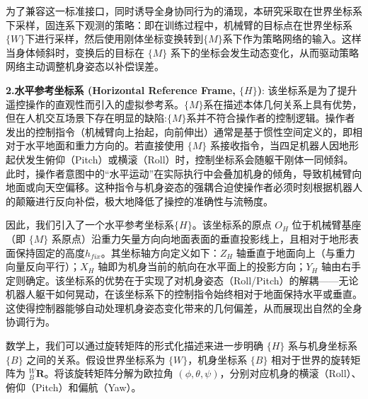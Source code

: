为了兼容这一标准接口，同时诱导全身协同行为的涌现，本研究采取在世界坐标系下采样，固连系下观测的策略：即在训练过程中，机械臂的目标点在世界坐标系$\{W\}$下进行采样，然后使用刚体坐标变换转到$\{M\}$系下作为策略网络的输入。这样当身体倾斜时，变换后的目标在 $\{M\}$ 系下的坐标会发生动态变化，从而驱动策略网络主动调整机身姿态以补偿误差。

\textbf{2.水平参考坐标系 (Horizontal Reference Frame, $\{H\}$)}: 该坐标系是为了提升遥控操作的直观性而引入的虚拟参考系。$\{M\}$系在描述本体几何关系上具有优势，但在人机交互场景下存在明显的缺陷:$\{M\}$系并不符合操作者的控制逻辑。操作者发出的控制指令（机械臂向上抬起，向前伸出）通常是基于惯性空间定义的，即相对于水平地面和重力方向的。若直接使用 $\{M\}$ 系接收指令，当四足机器人因地形起伏发生俯仰（Pitch）或横滚（Roll）时，控制坐标系会随躯干刚体一同倾斜。此时，操作者意图中的“水平运动”在实际执行中会叠加机身的倾角，导致机械臂向地面或向天空偏移。这种指令与机身姿态的强耦合迫使操作者必须时刻根据机器人的颠簸进行反向补偿，极大地降低了操控的准确性与流畅度。

因此，我们引入了一个水平参考坐标系$\{H\}$\cite{fu2023deep}。该坐标系的原点 $O_H$ 位于机械臂基座（即 $\{M\}$ 系原点）沿重力矢量方向向地面表面的垂直投影线上，且相对于地形表面保持固定的高度$h_{fix}$。其坐标轴方向定义如下：$Z_H$ 轴垂直于地面向上（与重力向量反向平行）；$X_H$ 轴即为机身当前的航向在水平面上的投影方向；$Y_H$ 轴由右手定则确定。该坐标系的优势在于实现了对机身姿态（Roll/Pitch）的解耦——无论机器人躯干如何晃动，在该坐标系下的控制指令始终相对于地面保持水平或垂直。这使得控制器能够自动处理机身姿态变化带来的几何偏差，从而展现出自然的全身协调行为。

数学上，我们可以通过旋转矩阵的形式化描述来进一步明确 $\{H\}$ 系与机身坐标系 $\{B\}$ 之间的关系。假设世界坐标系为 $\{W\}$，机身坐标系 $\{B\}$ 相对于世界的旋转矩阵为 $_B^W\mathbf{R}$。将该旋转矩阵分解为欧拉角 $(\phi, \theta, \psi)$，分别对应机身的横滚（Roll）、俯仰（Pitch）和偏航（Yaw）。

